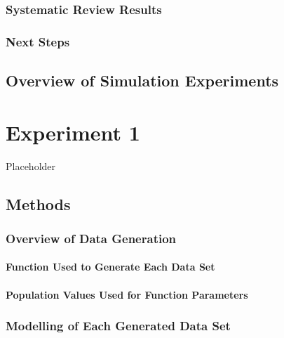 \documentclass[
12pt, %
twoside,
english]{guelphthesis}
\begin{document}
\hypertarget{systematic-review-results}{%
\subsection{Systematic Review Results}\label{systematic-review-results}}

\hypertarget{next-steps}{%
\subsection{Next Steps}\label{next-steps}}

\hypertarget{overview-of-simulation-experiments}{%
\section{Overview of Simulation Experiments}\label{overview-of-simulation-experiments}}

\hypertarget{exp-1}{%
\chapter{Experiment 1}\label{exp-1}}

Placeholder

\hypertarget{methods}{%
\section{Methods}\label{methods}}

\hypertarget{data-generation}{%
\subsection{Overview of Data Generation}\label{data-generation}}

\hypertarget{function-used-to-generate-each-data-set}{%
\subsubsection{Function Used to Generate Each Data Set}\label{function-used-to-generate-each-data-set}}

\hypertarget{population-values-used-for-function-parameters}{%
\subsubsection{Population Values Used for Function Parameters}\label{population-values-used-for-function-parameters}}

\hypertarget{data-modelling}{%
\subsection{Modelling of Each Generated Data Set}\label{data-modelling}}
\end{document}
